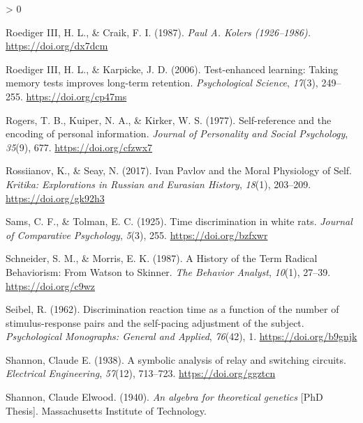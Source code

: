 \documentclass[
  oneside,
  12pt]{crumpbook}
\newlength{\cslhangindent}
\newenvironment{CSLReferences}[2] %
 {%
  \setlength{\parindent}{0pt}
  \ifodd #1 \everypar{\setlength{\hangindent}{\cslhangindent}}\ignorespaces\fi
  \ifnum #2 > 0
  \setlength{\parskip}{#2\baselineskip}
  \fi
 }%
 {}
\begin{document}
\begin{CSLReferences}{1}{0}
\leavevmode\hypertarget{ref-roedigeriiiPaulKolers19261987}{}%
Roediger III, H. L., \& Craik, F. I. (1987). \emph{Paul {A}. {Kolers} (1926--1986).} \url{https://doi.org/dx7dcm}

\leavevmode\hypertarget{ref-roedigeriiiTestenhancedLearningTaking2006}{}%
Roediger III, H. L., \& Karpicke, J. D. (2006). Test-enhanced learning: {Taking} memory tests improves long-term retention. \emph{Psychological Science}, \emph{17}(3), 249--255. \url{https://doi.org/cp47ms}

\leavevmode\hypertarget{ref-rogersSelfreferenceEncodingPersonal1977}{}%
Rogers, T. B., Kuiper, N. A., \& Kirker, W. S. (1977). Self-reference and the encoding of personal information. \emph{Journal of Personality and Social Psychology}, \emph{35}(9), 677. \url{https://doi.org/cfzwx7}

\leavevmode\hypertarget{ref-rossiianovIvanPavlovMoral2017}{}%
Rossiianov, K., \& Seay, N. (2017). Ivan {Pavlov} and the {Moral Physiology} of {Self}. \emph{Kritika: Explorations in Russian and Eurasian History}, \emph{18}(1), 203--209. \url{https://doi.org/gk92h3}

\leavevmode\hypertarget{ref-samsTimeDiscriminationWhite1925}{}%
Sams, C. F., \& Tolman, E. C. (1925). Time discrimination in white rats. \emph{Journal of Comparative Psychology}, \emph{5}(3), 255. \url{https://doi.org/bzfxwr}

\leavevmode\hypertarget{ref-schneiderHistoryTermRadical1987}{}%
Schneider, S. M., \& Morris, E. K. (1987). A {History} of the {Term Radical Behaviorism}: {From Watson} to {Skinner}. \emph{The Behavior Analyst}, \emph{10}(1), 27--39. \url{https://doi.org/c9wz}

\leavevmode\hypertarget{ref-seibelDiscriminationReactionTime1962}{}%
Seibel, R. (1962). Discrimination reaction time as a function of the number of stimulus-response pairs and the self-pacing adjustment of the subject. \emph{Psychological Monographs: General and Applied}, \emph{76}(42), 1. \url{https://doi.org/b9gnjk}

\leavevmode\hypertarget{ref-shannonSymbolicAnalysisRelay1938}{}%
Shannon, Claude E. (1938). A symbolic analysis of relay and switching circuits. \emph{Electrical Engineering}, \emph{57}(12), 713--723. \url{https://doi.org/ggztcn}

\leavevmode\hypertarget{ref-shannonAlgebraTheoreticalGenetics1940}{}%
Shannon, Claude Elwood. (1940). \emph{An algebra for theoretical genetics} {[}PhD Thesis{]}. {Massachusetts Institute of Technology}.


\end{CSLReferences}
\end{document}
